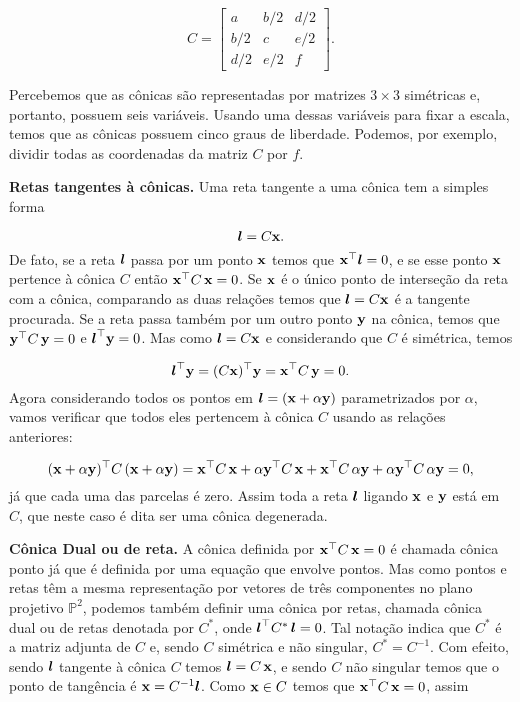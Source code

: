 \begin{equation*}
C =  \begin{bmatrix}
      a & b/2 & d/2\\
      b/2 & c & e/2\\
      d/2 & e/2 & f
      \end{bmatrix}.
\end{equation*}

Percebemos que as cônicas são representadas por matrizes $3\times3$ simétricas e, portanto, possuem seis variáveis. Usando uma dessas variáveis para fixar a escala, temos que as cônicas possuem cinco graus de liberdade. Podemos, por exemplo, dividir todas as coordenadas da matriz $C$ por $f$. 

{\bf Retas tangentes à cônicas.} Uma reta tangente a uma cônica tem a simples forma

\begin{equation*}
\boldsymbol{l}=C\mathbf{x}.
\end{equation*}
De fato, se a reta $\boldsymbol{l}$ passa por um ponto $\mathbf{x}$ temos que $\mathbf{x}^\top\boldsymbol{l}=0$, e se esse ponto $\mathbf{x}$ pertence à cônica $C$ então $\mathbf{x}^\top C\,\mathbf{x}=0$. Se $\mathbf{x}$ é o único ponto de interseção da reta com a cônica, comparando as duas relações  temos que $\boldsymbol{l}=C\mathbf{x}$ é a tangente procurada. Se a reta passa também por um outro ponto ${\bf y}$ na cônica, temos que ${\bf y}^\top C\,{\bf y}=0$ e $\boldsymbol{l}^\top{\bf y}=0$. Mas como $\boldsymbol{l}=C\mathbf{x}$ e considerando que $C$ é simétrica, temos

\begin{equation*}
\boldsymbol{l}^\top{\bf y}=(C\mathbf{x})^\top{\bf y}=\mathbf{x}^\top C\,{\bf y}=0.
\end{equation*}  
Agora considerando todos os pontos em $\boldsymbol{l}=(\mathbf{x}+\alpha{\bf y})$ parametrizados por $\alpha$, vamos verificar que todos eles pertencem à cônica $C$ usando as relações anteriores:

\begin{equation*}
(\mathbf{x}+\alpha{\bf y})^\top C\,(\mathbf{x}+\alpha{\bf y})=\mathbf{x}^\top C\,\mathbf{x}+\alpha{\bf y}^\top C\,\mathbf{x}+\mathbf{x}^\top C\,\alpha{\bf y}+\alpha{\bf y}^\top C\,\alpha{\bf y}=0,
\end{equation*}
já que cada uma das parcelas é zero. Assim toda a reta $\boldsymbol{l}$ ligando $\mathbf{x}$ e ${\bf y}$ está em $C$, que neste caso é dita ser uma cônica degenerada.

{\bf Cônica Dual ou de reta.} A cônica definida por $\mathbf{x}^\top C\,\mathbf{x}=0$ é chamada cônica ponto já que é definida por uma equação que envolve pontos. Mas como pontos e retas têm a mesma representação por vetores de três componentes no plano projetivo $\mathbb{P}^2$, podemos também definir uma cônica por retas, chamada cônica dual ou de retas denotada por $C^*$, onde $\boldsymbol{l}^\top C^*\,\boldsymbol{l}=0$. Tal notação indica que $C^*$ é a matriz adjunta de $C$ e, sendo $C$ simétrica e não singular, $C^*=C^{-1}$. Com efeito, sendo $\boldsymbol{l}$ tangente à cônica $C$ temos $\boldsymbol{l}=C\,\mathbf{x}$, e sendo $C$ não singular temos que o ponto de tangência é $\mathbf{x}=C^{-1}\boldsymbol{l}$. Como $\mathbf{x}\in C$ temos que $\mathbf{x}^\top C\,\mathbf{x}=0$, assim

